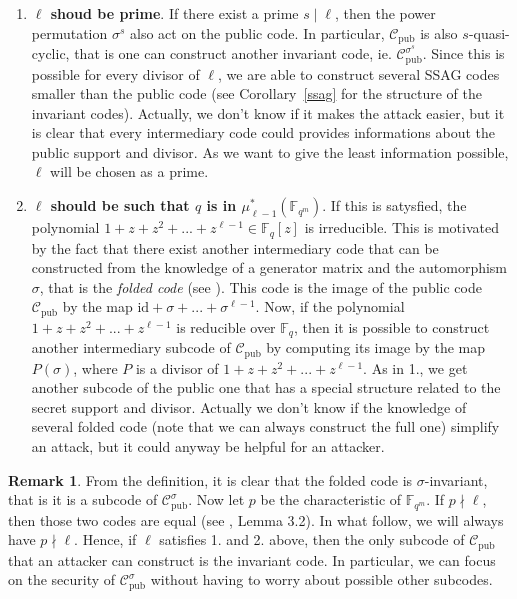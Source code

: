 \documentclass[10pt]{article}
\theoremstyle{definition}
\theoremstyle{definition}
\newtheorem{rq1}[thm]{Remark}
\theoremstyle{definition}
\newcommand{\s}{\vspace{0.3cm}}
\newcommand{\C}{\mathcal{C}}
\newcommand{\fqm}{\mathbb{F}_{q^m}}
\newcommand{\fq}{\mathbb{F}_q}
\begin{document}
\s

\begin{enumerate}
\item \textbf{$\ell$ shoud be prime}. If there exist a prime $s \mid \ell$, then the power permutation $\sigma^s$ also act on the public code. In particular, $\C_{\textrm{pub}}$ is also $s$-quasi-cyclic, that is one can construct another invariant code, ie. $\C_{\textrm{pub}}^{\sigma^s}$. Since this is possible for every divisor of $\ell$, we are able to construct several SSAG codes smaller than the public code (see Corollary~\ref{ssag} for the structure of the invariant codes). Actually, we don't know if it makes the attack easier, but it is clear that every intermediary code could provides informations about the public support and divisor. As we want to give the least information possible, $\ell$ will be chosen as a prime.

\item \textbf{$\ell$ should be such that $q$ is in $\mu_{\ell -1}^*(\fqm)$}. If this is satysfied, the polynomial $1+z+z^2+...+z^{\ell-1} \in \fq[z]$ is irreducible. This is motivated by the fact that there exist another intermediary code that can be constructed from the knowledge of a generator matrix and the automorphism $\sigma$, that is the \textit{folded code} (see \cite{FOP}). This code is the image of the public code $\C_{\textrm{pub}}$ by the map $\mathrm{id} +\sigma+...+\sigma^{\ell-1}$. Now, if the polynomial $1+z+z^2+...+z^{\ell-1}$ is reducible over $\fq$, then it is possible to construct another intermediary subcode of $\C_{\mathrm{pub}}$ by computing its image by the map $P(\sigma)$, where $P$ is a divisor of $1+z+z^2+...+z^{\ell-1}$. As in 1., we get another subcode of the public one that has a special structure related to the secret support and divisor. Actually we don't know if the knowledge of several folded code (note that we can always construct the full one) simplify an attack, but it could anyway be helpful for an attacker.
\end{enumerate}

\s

\begin{rq1} \label{un seul subcode} 
From the definition, it is clear that the folded code is $\sigma$-invariant, that is it is a subcode of $\C_{\mathrm{pub}}^{\sigma}$. Now let $p$ be the characteristic of $\fqm$. If $p \nmid \ell$, then those two codes are equal (see \cite{Bar1} , Lemma 3.2). In what follow, we will always have $p \nmid \ell$. Hence, if $\ell$ satisfies 1. and 2. above, then the only subcode of $\mathcal{C}_{\mathrm{pub}}$ that an attacker can construct is the invariant code. In particular, we can focus on the security of $\C_{\textrm{pub}}^{\sigma}$ without having to worry about possible other subcodes.  
\end{rq1}
\end{document}
